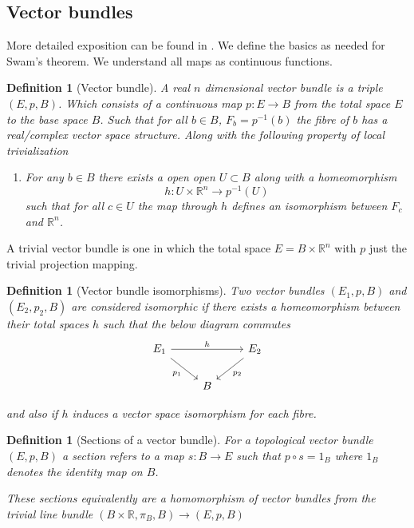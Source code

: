 \documentclass[12pt]{article}
\numberwithin{equation}{section}
\newcommand{\R}{\mathbb{R}}
\newcounter{dummy} \numberwithin{dummy}{section}
\newtheorem{definition}[dummy]{Definition}
\begin{document}
\begin{appendices}
	
	\section{Vector bundles}
	More detailed exposition can be found in \cite{milnor1974characteristic}. We define the basics as needed for Swam's theorem. We understand all maps as continuous functions.
	\begin{definition}[Vector bundle]
		A real $n$ dimensional vector bundle is a triple $(E,p, B)$. Which consists of a continuous map $p:E \to B$ from the total space $E$ to the base space $B$. Such that for all $b \in B$, $F_b=p^{-1}(b)$ the fibre of $b$ has a real/complex vector space structure. Along with the following property of local trivialization
		\begin{enumerate}
			 \item For any $b \in B$ there exists a open open $U \subset B$ along with a homeomorphism \[ h: U \times \R^n	\to p^{-1}(U) \] such that for all $c \in U$ the map through $h$ defines an isomorphism between $F_c$ and $\R^n$.
		\end{enumerate}
	\end{definition}
	
	A trivial vector bundle is one in which the total space $E=B \times \R^n$ with $p$ just the trivial projection mapping.
	
	
	\begin{definition}[Vector bundle isomorphisms]
		Two vector bundles $(E_1,p, B)$ and $(E_2,p_2, B) $ are considered isomorphic if there exists a homeomorphism between their total spaces $h$ such that the below diagram commutes
		\[\begin{tikzcd}
			{E_1} && {E_2} \\
			& B
			\arrow["{p_1}"', from=1-1, to=2-2]
			\arrow["{p_2}", from=1-3, to=2-2]
			\arrow["h", from=1-1, to=1-3]
		\end{tikzcd}\]
		
		and also if $h$ induces a vector space isomorphism for each fibre.
	\end{definition}
	
	\begin{definition}[Sections of a vector bundle]
		For a topological vector bundle $(E,p,B)$ a section refers to a map	$s: B \to E$ such that $p \circ s= 1_B$ where $1_B$ denotes the identity map on $B$.
		
		These sections equivalently are a homomorphism of vector bundles from the trivial line bundle $(B \times \R, \pi_B, B) \to (E,p,B)$
	\end{definition}
%	
%	
%	

\end{appendices}
\end{document}
